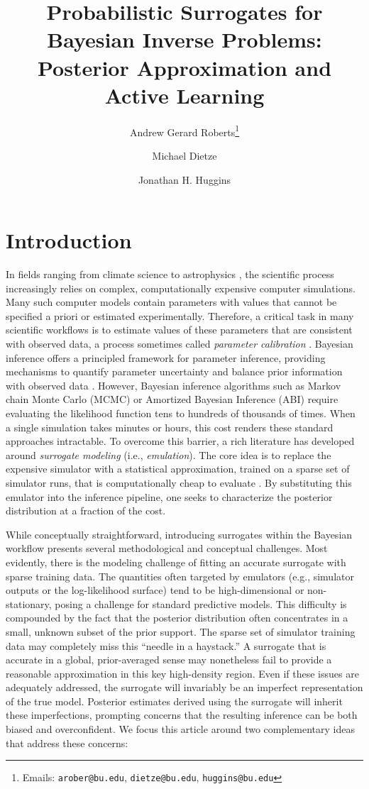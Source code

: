 \documentclass[12pt]{article}
\title{Probabilistic Surrogates for Bayesian Inverse Problems: Posterior Approximation and Active Learning}
\author[1]{Andrew Gerard Roberts\thanks{Emails: \texttt{arober@bu.edu}, \texttt{dietze@bu.edu}, \texttt{huggins@bu.edu}}}
\author[2]{Michael Dietze}
\author[1,3]{Jonathan H. Huggins}
\affil[1]{Faculty of Computing and Data Sciences, Boston University}
\affil[2]{Department of Earth and Environment, Boston University}
\affil[3]{Department of Mathematics and Statistics, Boston University}
\date{}
\begin{document}
\maketitle

\section{Introduction}
In fields ranging from climate science \citep{ESM_modeling_2pt0,ESMReview} to astrophysics
\citep{VarmaBlackHole2019,npeAstrophysics}, the scientific process increasingly relies on complex, computationally
expensive computer simulations. Many such computer models contain parameters with values that cannot be specified
a priori or estimated experimentally. Therefore, a critical task in many scientific workflows is to estimate values
of these parameters that are consistent with observed data, a process sometimes called 
\textit{parameter calibration} \citep{computerModelCalibrationReview}.
Bayesian inference offers a principled framework for parameter inference, providing mechanisms to 
quantify parameter uncertainty and balance prior information with observed data \citep{gelmanBDA}.
However, Bayesian inference algorithms such as Markov chain Monte Carlo (MCMC) or Amortized 
Bayesian Inference (ABI) require evaluating the likelihood function tens to hundreds of thousands of times. 
When a single simulation takes minutes or hours, this cost renders these standard approaches intractable.
To overcome this barrier, a rich literature has developed around \textit{surrogate modeling} (i.e., \textit{emulation}). The core 
idea is to replace the expensive simulator with a statistical approximation, trained on a sparse set of simulator runs, that is 
computationally cheap to evaluate \citep{KOH,gramacy2020surrogates}. By substituting this emulator into the inference pipeline, 
one seeks to characterize the posterior distribution at a fraction of the cost.

While conceptually straightforward, introducing surrogates within the Bayesian workflow presents several 
methodological and conceptual challenges. Most evidently, there is the modeling challenge of fitting 
an accurate surrogate with sparse training data. The quantities often targeted by emulators 
(e.g., simulator outputs or the log-likelihood surface) tend to be high-dimensional or non-stationary, 
posing a challenge for standard predictive models. This difficulty is compounded by the fact that the
posterior distribution often concentrates in a small, unknown subset of the prior support. The sparse
set of simulator training data may completely miss this ``needle in a haystack.'' A surrogate
that is accurate in a global, prior-averaged sense may nonetheless fail to provide a reasonable
approximation in this key high-density region. Even if these issues are adequately addressed,
the surrogate will invariably be an imperfect representation of the true model. Posterior estimates derived 
using the surrogate will inherit these imperfections, prompting concerns that the resulting inference can be 
both biased and overconfident. We focus this article around two complementary ideas that address these concerns:
\end{document}
